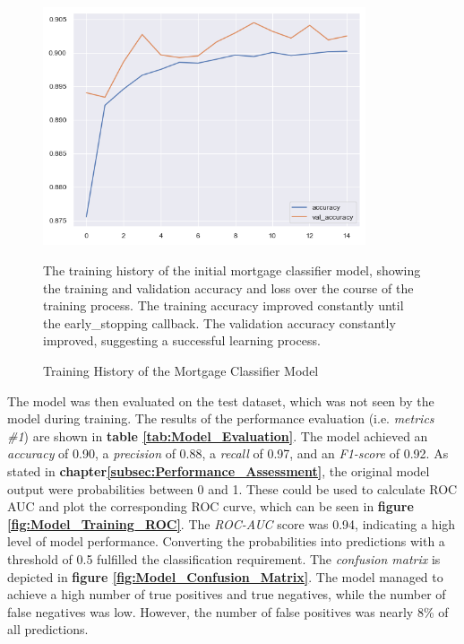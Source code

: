 \begin{figure}
    \centering
    \includegraphics[width=0.85\textwidth]{images/Model_Training/Initial_Training_History.png}
    \caption{Training History of the Mortgage Classifier Model}
    \medskip
    \small
    The training history of the initial mortgage classifier model, showing the training and validation accuracy and loss over the course of the training process. The training accuracy improved constantly until the early\_stopping callback. The validation accuracy constantly improved, suggesting a successful learning process.
    \label{fig:Model_Training_History}
\end{figure}

The model was then evaluated on the test dataset, which was not seen by the model during training. The results of the performance evaluation (i.e. \textit{metrics \#1}) are shown in \textbf{table \ref{tab:Model_Evaluation}}. The model achieved an \textit{accuracy} of 0.90, a \textit{precision} of 0.88, a \textit{recall} of 0.97, and an \textit{F1-score} of 0.92. 
As stated in \textbf{chapter\ref{subsec:Performance_Assessment}}, the original model output were probabilities between 0 and 1. These could be used to calculate ROC AUC and plot the corresponding ROC curve, which can be seen in \textbf{figure \ref{fig:Model_Training_ROC}}. The \textit{ROC-AUC} score was 0.94, indicating a high level of model performance. 
Converting the probabilities into predictions with a threshold of 0.5 fulfilled the classification requirement. The \textit{confusion matrix} is depicted in \textbf{figure \ref{fig:Model_Confusion_Matrix}}. The model managed to achieve a high number of true positives and true negatives, while the number of false negatives was low. However, the number of false positives was nearly 8\% of all predictions.

